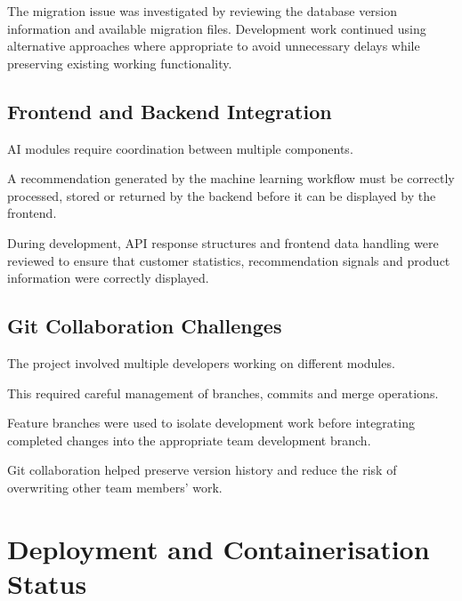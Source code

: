 \documentclass[12pt,a4paper]{report}
\begin{document}
The migration issue was investigated by reviewing the database version
information and available migration files. Development work continued
using alternative approaches where appropriate to avoid unnecessary
delays while preserving existing working functionality.



\section{Frontend and Backend Integration}

AI modules require coordination between multiple components.

A recommendation generated by the machine learning workflow must be
correctly processed, stored or returned by the backend before it can be
displayed by the frontend.

During development, API response structures and frontend data handling
were reviewed to ensure that customer statistics, recommendation
signals and product information were correctly displayed.



\section{Git Collaboration Challenges}

The project involved multiple developers working on different modules.

This required careful management of branches, commits and merge
operations.

Feature branches were used to isolate development work before
integrating completed changes into the appropriate team development
branch.

Git collaboration helped preserve version history and reduce the risk
of overwriting other team members' work.

\newpage



\chapter{Deployment and Containerisation Status}
\end{document}
